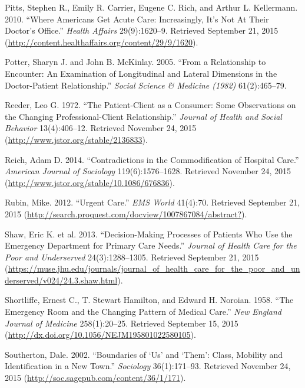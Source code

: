 \documentclass[12pt,twoside]{reedthesis}
\begin{document}
  \hypertarget{ref-pittsux5fwhereux5f2010}{}
  Pitts, Stephen R., Emily R. Carrier, Eugene C. Rich, and Arthur L.
  Kellermann. 2010. ``Where Americans Get Acute Care: Increasingly, It's
  Not At Their Doctor's Office.'' \emph{Health Affairs} 29(9):1620--9.
  Retrieved September 21, 2015
  (\url{http://content.healthaffairs.org/content/29/9/1620}).
  
  \hypertarget{ref-potterux5frelationshipux5f2005}{}
  Potter, Sharyn J. and John B. McKinlay. 2005. ``From a Relationship to
  Encounter: An Examination of Longitudinal and Lateral Dimensions in the
  Doctor-Patient Relationship.'' \emph{Social Science \& Medicine (1982)}
  61(2):465--79.
  
  \hypertarget{ref-reederux5fpatient-clientux5f1972}{}
  Reeder, Leo G. 1972. ``The Patient-Client as a Consumer: Some
  Observations on the Changing Professional-Client Relationship.''
  \emph{Journal of Health and Social Behavior} 13(4):406--12. Retrieved
  November 24, 2015 (\url{http://www.jstor.org/stable/2136833}).
  
  \hypertarget{ref-reichux5fcontradictionsux5f2014}{}
  Reich, Adam D. 2014. ``Contradictions in the Commodification of Hospital
  Care.'' \emph{American Journal of Sociology} 119(6):1576--1628.
  Retrieved November 24, 2015
  (\url{http://www.jstor.org/stable/10.1086/676836}).
  
  \hypertarget{ref-rubinux5furgentux5f2012}{}
  Rubin, Mike. 2012. ``Urgent Care.'' \emph{EMS World} 41(4):70. Retrieved
  September 21, 2015
  (\url{http://search.proquest.com/docview/1007867084/abstract?}).
  
  \hypertarget{ref-shawux5f2013}{}
  Shaw, Eric K. et al. 2013. ``Decision-Making Processes of Patients Who
  Use the Emergency Department for Primary Care Needs.'' \emph{Journal of
  Health Care for the Poor and Underserved} 24(3):1288--1305. Retrieved
  September 21, 2015
  (\url{https://muse.jhu.edu/journals/journal_of_health_care_for_the_poor_and_underserved/v024/24.3.shaw.html}).
  
  \hypertarget{ref-SHORTLIFFEux5f1958}{}
  Shortliffe, Ernest C., T. Stewart Hamilton, and Edward H. Noroian. 1958.
  ``The Emergency Room and the Changing Pattern of Medical Care.''
  \emph{New England Journal of Medicine} 258(1):20--25. Retrieved
  September 15, 2015
  (\url{http://dx.doi.org/10.1056/NEJM195801022580105}).
  
  \hypertarget{ref-southertonux5fboundariesux5f2002}{}
  Southerton, Dale. 2002. ``Boundaries of `Us' and `Them': Class, Mobility
  and Identification in a New Town.'' \emph{Sociology} 36(1):171--93.
  Retrieved November 24, 2015
  (\url{http://soc.sagepub.com/content/36/1/171}).
  
\end{document}
